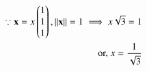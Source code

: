 \begin{align} 
\because
\mathbf{x}=x\begin{pmatrix}1\\1\\1\end{pmatrix},
\left\lVert\mathbf{x}\right\rVert=1
\implies 
x\sqrt{3}=1
\\
	\text{or, }x=\frac{1}{\sqrt{3}}
\end{align}   
